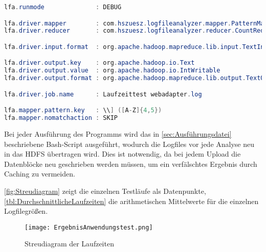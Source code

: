 \begin{lstlisting}[language=Java,caption=Properties für Anwendungstest,label=lis:PropertiesAnwendungstest]
lfa.runmode              : DEBUG

lfa.driver.mapper        : com.hszuesz.logfileanalyzer.mapper.PatternMapper
lfa.driver.reducer       : com.hszuesz.logfileanalyzer.reducer.CountReducer

lfa.driver.input.format  : org.apache.hadoop.mapreduce.lib.input.TextInputFormat

lfa.driver.output.key    : org.apache.hadoop.io.Text
lfa.driver.output.value  : org.apache.hadoop.io.IntWritable
lfa.driver.output.format : org.apache.hadoop.mapreduce.lib.output.TextOutputFormat

lfa.driver.job.name      : Laufzeittest webadapter.log

lfa.mapper.pattern.key   : \\] ([A-Z]{4,5})
lfa.mapper.nomatchaction : SKIP
\end{lstlisting}

Bei jeder Ausführung des Programms wird das in \autoref{sec:Ausführungsdatei} beschriebene Bash-Script ausgeführt, wodurch die Logfiles vor jede Analyse neu in das \ac{HDFS} übertragen wird. Dies ist notwendig, da bei jedem Upload die Datenblöcke neu geschrieben werden müssen, um ein verfälschtes Ergebnis durch Caching zu vermeiden.

\autoref{fig:Streudiagram} zeigt die einzelnen Testläufe als Datenpunkte, \autoref{tbl:DurchschnittlicheLaufzeiten} die arithmetischen Mittelwerte für die einzelnen Logfilegrößen.

\begin{figure}
	\centering
	\texttt{[image: ErgebnisAnwendungstest.png]}
	\caption{Streudiagram der Laufzeiten}
	\label{fig:Streudiagram}
\end{figure}

